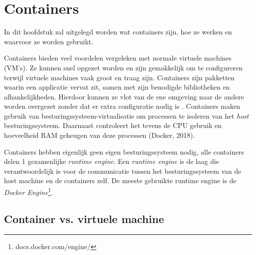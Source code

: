 \section{Containers} \label{containers}
In dit hoofdstuk zal uitgelegd worden wat containers zijn, hoe ze werken en waarvoor ze worden gebruikt.

Containers bieden veel voordelen vergeleken met normale virtuele machines (VM's). Ze kunnen snel opgezet worden en zijn gemakkelijk om te configureren terwijl virtuele machines vaak groot en traag zijn. Containers zijn pakketten waarin een applicatie vervat zit, samen met zijn benodigde bibliotheken en afhankelijkheden. Hierdoor kunnen ze vlot van de ene omgeving naar de andere worden overgezet zonder dat er extra configuratie nodig is \autocite{Education2019}. Containers maken gebruik van besturingssysteem-virtualisatie om processen te isoleren van het \textit{host} besturingssysteem. Daarnaast controleert het tevens de CPU gebruik en hoeveelheid RAM geheugen van deze processen (Docker, 2018).

Containers hebben eigenlijk geen eigen besturingssysteem nodig, alle containers delen 1 gezamenlijke \textit{runtime engine}. Een \textit{runtime engine} is de laag die verantwoordelijk is voor de communicatie tussen het besturingssysteem van de host machine en de containers zelf. De meeste gebruikte runtime engine is de \textit{Docker Engine}\footnote{docs.docker.com/engine/}.

\subsection{Container vs. virtuele machine}
